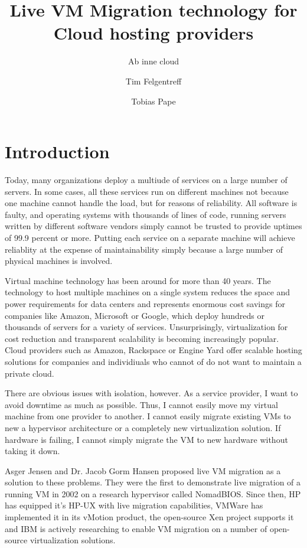 \documentclass{scrartcl}
\title{Live VM Migration technology for Cloud hosting providers}
\subtitle{Ab inne cloud}
\author{Tim Felgentreff \and Tobias Pape}
\begin{document}
\maketitle
\tableofcontents

\section{Introduction}
\label{sec:introduction}
Today, many organizations deploy a multiude of services on a large
number of servers. In some cases, all these services run on different
machines not because one machine cannot handle the load, but for
reasons of reliability.  All software is faulty\cite{Zeller2006}, and
operating systems with thousands of lines of code, running servers
written by different software vendors simply cannot be trusted to
provide uptimes of 99.9 percent or more. Putting each service on a
separate machine will achieve reliablity at the expense of
maintainability simply because a large number of physical machines is
involved.

Virtual machine technology has been around for more than 40
years\cite{tanenbaum1992modern}. The technology to host multiple
machines on a single system reduces the space and power requirements
for data centers and represents enormous cost savings for companies
like Amazon, Microsoft or Google, which deploy hundreds or thousands
of servers for a variety of services. Unsurprisingly, virtualization
for cost reduction and transparent scalability is becoming
increasingly popular. Cloud providers such as Amazon, Rackspace or
Engine Yard offer scalable hosting solutions for companies and
individiuals who cannot of do not want to maintain a private cloud.

There are obvious issues with isolation, however. As a service
provider, I want to avoid downtime as much as possible. Thus, I cannot
easily move my virtual machine from one provider to another. I cannot
easily migrate existing VMs to new a hypervisor architecture or a
completely new virtualization solution. If hardware is failing, I
cannot simply migrate the VM to new hardware without taking it down.

Asger Jensen and Dr. Jacob Gorm Hansen proposed live VM migration as a
solution to these problems. They were the first to demonstrate live
migration of a running VM in 2002 on a research hypervisor called
NomadBIOS. Since then, HP has equipped it's HP-UX with live migration
capabilities, VMWare has implemented it in its vMotion product, the
open-source Xen project supports it and IBM is actively researching to
enable VM migration on a number of open-source virtualization
solutions.
\end{document}
